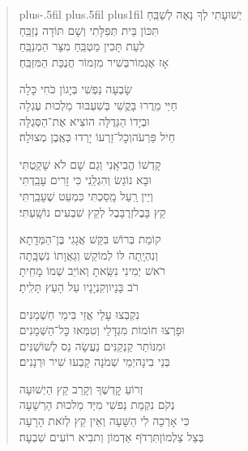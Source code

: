 \documentclass[twoside, openany, parskip=half, 11pt]{book}
\begin{document}
\begin{quote}
\leftskip=0pt plus-.5fil
\rightskip=0pt plus.5fil
\parfillskip=0pt plus1fil
יְשׁוּעָתִי \hfill לְךָ נָאֶה לְשַׁבֵּֽחַ \\ תִּכּוֹן בֵּית תְּפִלָּתִי \hfill וְשָׁם תּוֹדָה נְזַבֵּֽחַ \\
לְעֵת תָּכִין מַטְבֵּֽחַ \hfill מִצָּר הַמְנַבֵּֽחַ \\ אָז אֶגְמוֹר\hfill בְּשִׁיר מִזְמוֹר \hfill חֲנֻכַּת הַמִּזְבֵּֽחַ׃

שָׂבְעָה נַפְשִׁי \hfill בְּיָגוֹן כֹּחִי כָּלָה \\ חַיַּי מֵרֲרוּ בָּקֳשִׁי \hfill בְּשִׁעְבּוּד מַלְכוּת עֶגְלָה \\
וּבְיָדוֹ הַגְּדֻלָּה \hfill הוֹצִיא אֶת־הַסְּגֻלָּה \\ חֵיל פַּרְעֹה\hfill וְכׇל־זַרְעוֹ \hfill יָרְדוּ כְּאֶֽבֶן מְצוּלָה׃

קָדְשׁוֹ הֱבִיאַֽנִי \hfill וְגַם שָׁם לֹא שָׁקַֽטְתִּי \\ וּבָא נוֹגֵשׂ וְהִגְלַֽנִי \hfill כִּי זָרִים עָבַֽדְתִּי \\
וְיֵין רַֽעַל מָֽסַכְתִּי \hfill כִּמְעַט שֶׁעָבַֽרְתִּי \\ קֵץ בָּבֶל\hfill זְרֻבָּבֶל \hfill לְקֵץ שִׁבְעִים נוֹשָֽׁעְתִּי׃

קוֹמַת בְּרוֹשׁ בִּקֵּשׁ \hfill אֲגָגִי בֶּן־הַמְּדָֽתָא \\ וְנִהְיָֽתָה לּוֹ לְמוֹקֵשׁ \hfill וְגַאֲוָתוֹ נִשְׁבָּֽתָה \\
רֹאשׁ יְמִינִי נִשֵּֽׂאתָ \hfill וְאוֹיֵב שְׁמוֹ מָחִֽיתָ \\ רֹב בָּנָיו\hfill וְקִנְיָנָיו \hfill עַל הָעֵץ תָּלִֽיתָ׃

נִקְבְּצוּ עָלַי \hfill אֲזַי בִּימֵי חַשְׁמַנִּים \\ וּפָרְצוּ חוֹמוֹת מִגְדָּלַי \hfill וְטִמְּאוּ כׇּל־הַשְּׁמָנִים \\
וּמִנּוֹתַר קַנְקַנִּים \hfill נַעֲשָׂה נֵס לְשׁוֹשַׁנִּים \\ בְּנֵי בִינָה\hfill יְמֵי שְׁמֹנָה \hfill קָבְעוּ שִׁיר וּרְנָנִים׃

זְרוֹעַ קׇדְשֶׁךָ \hfill וְקָרֵב קֵץ הַיְשׁוּעָה\\נְקֹם נִקְמַת נַפשִׁי \hfill מִיַּד מַלכוּת הָרְשָׁעָה\\
כִּי אָרְכָה לִי הַשָּׁעָה \hfill וְאֵין קֵץ לְזׂאת הָרָעָה\\בְּצֵל צַלְמוֹן\hfill תִּרְדּׂף אַדְמוֹן \hfill וְתבִיא רוֹעִים שִׁבְעָה׃

\end{quote}
\end{document}
